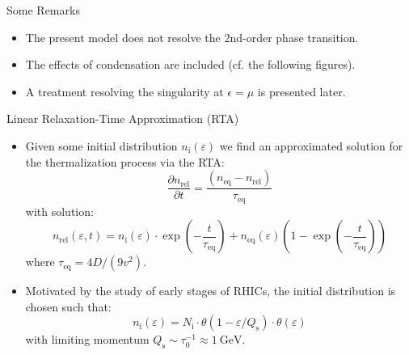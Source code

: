 \begin{frame}{Some Remarks}
\begin{itemize}
	\item The present model does \alert{not} resolve the 2nd-order phase transition.
	\item The effects of condensation are included (cf. the following figures).
	\item A treatment resolving the singularity at $\epsilon=\mu$ is presented later.
\end{itemize}
\end{frame}

\begin{frame}{Linear Relaxation-Time Approximation (RTA)}
\begin{itemize}
	\item Given some initial distribution $n_{\mathrm{i}}(\varepsilon)$ we find an approximated solution for the thermalization process via the RTA:
\begin{equation}
	\frac{\partial n_{\mathrm{rel}}}{\partial t} = \frac{(n_{\mathrm{eq}} - n_{\mathrm{
rel}})}{\tau_{\mathrm{eq}}}
\end{equation}
with solution:
\begin{equation}
	n_{\mathrm{rel}}(\varepsilon,t) = n_{\mathrm{i}}(\varepsilon)\cdot\exp\left(-\frac{t}{\tau_{\mathrm{eq}}}\right) +  n_{\mathrm{eq}}(\varepsilon)\left(1-\exp\left(-\frac{t}{\tau_{\mathrm{eq}}}\right)\right)
\end{equation}	
where $\tau_{\mathrm{eq}} = 4D/(9v^2)$.
\item Motivated by the study of early stages of RHICs, the initial distribution is chosen such that:
\begin{equation}
	n_{\mathrm{i}}(\varepsilon) = N_{\mathrm{i}}\cdot\theta\left(1-\varepsilon/Q_{\mathrm{s}}\right)\cdot\theta(\varepsilon) \label{eqn:rta_initial}
\end{equation}
with limiting momentum $Q_{\mathrm{s}} \sim \tau_0^{-1} \approx 1\ \mathrm{GeV}$.
\end{itemize}
\end{frame}

